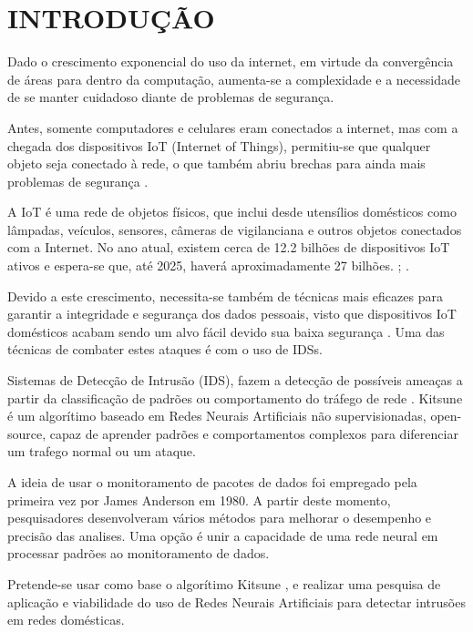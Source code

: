 \chapter{INTRODUÇÃO}
Dado o crescimento exponencial do uso da internet, em virtude da convergência de áreas para dentro da computação, aumenta-se a complexidade e a necessidade de se manter cuidadoso diante de problemas de segurança. \cite{mendes2020redes}

Antes, somente computadores e celulares eram conectados a internet, mas com a chegada dos dispositivos IoT (Internet of Things), permitiu-se que qualquer objeto seja conectado à rede, o que também abriu brechas para ainda mais problemas de segurança \cite{alrawi}.

 A IoT é uma rede de objetos físicos, que inclui desde utensílios domésticos como lâmpadas, veículos, sensores, câmeras de vigilanciana e outros objetos conectados com a Internet. No ano atual, existem cerca de 12.2 bilhões de dispositivos IoT ativos e espera-se que, até 2025, haverá aproximadamente 27 bilhões. \cite{Gomes_2022}; \cite{IoTResearch}.

Devido a este crescimento, necessita-se também de técnicas mais eficazes para garantir a integridade e segurança dos dados pessoais, visto que dispositivos IoT domésticos acabam sendo um alvo fácil devido sua baixa segurança \cite{Otoum}. Uma das técnicas de combater estes ataques é com o uso de IDSs.

Sistemas de Detecção de Intrusão (IDS), fazem a detecção de possíveis ameaças a partir da classificação de padrões ou comportamento do tráfego de rede \cite{Shurman}. Kitsune é um algorítimo baseado em Redes Neurais Artificiais não supervisionadas, open-source, capaz de aprender padrões e comportamentos complexos para diferenciar um trafego normal ou um ataque. \cite{kitsune}

A ideia de usar o monitoramento de pacotes de dados foi empregado pela primeira vez por James Anderson em 1980. A partir deste momento, pesquisadores desenvolveram vários métodos para melhorar o desempenho e precisão das analises. Uma opção é unir a capacidade de uma rede neural em processar padrões ao monitoramento de dados.

Pretende-se usar como base o algorítimo Kitsune \cite{kitsune}, e realizar uma pesquisa de aplicação e viabilidade do uso de Redes Neurais Artificiais para detectar intrusões em redes domésticas.